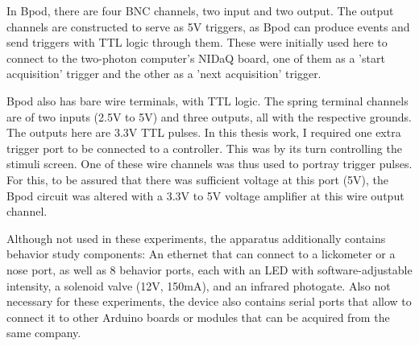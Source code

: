 In Bpod, there are four BNC channels, two input and two output. The output channels are constructed to serve as 5V triggers, as Bpod can produce events and send triggers with TTL logic through them. These were initially used here to connect to the two-photon computer's NIDaQ board, one of them as a 'start acquisition' trigger and the other as a 'next acquisition' trigger. 

Bpod also has bare wire terminals, with TTL logic. The spring terminal channels are of two inputs (2.5V to 5V) and three outputs, all with the respective grounds. The outputs here are 3.3V TTL pulses. In this thesis work, I required one extra trigger port to be connected to a  controller. This was by its turn controlling the stimuli screen. One of these wire channels was thus used to portray trigger pulses. For this, to be assured that there was sufficient voltage at this port (5V), the Bpod circuit was altered with a 3.3V to 5V voltage amplifier at this wire output channel.

Although not used in these experiments, the apparatus additionally contains behavior study components: An ethernet that can connect to a lickometer or a nose port, as well as 8 behavior ports, each with an LED with software-adjustable intensity, a solenoid valve (12V, 150mA), and an infrared photogate. Also not necessary for these experiments, the device also contains serial ports that allow to connect it to other Arduino boards or modules that can be acquired from the same company.



